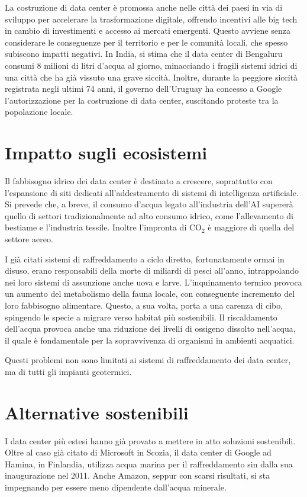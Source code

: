 \documentclass[12pt,a4paper,oneside]{book}
\begin{document}
La costruzione di data center è promossa anche nelle città dei paesi in via di sviluppo per accelerare la trasformazione digitale, offrendo incentivi alle big tech in cambio di investimenti e accesso ai mercati emergenti. Questo avviene senza considerare le conseguenze per il territorio e per le comunità locali, che spesso subiscono impatti negativi.
In India, si stima che il data center di Bengaluru consumi 8 milioni di litri d'acqua al giorno, minacciando i fragili sistemi idrici di una città che ha già vissuto una grave siccità.
Inoltre, durante la peggiore siccità registrata negli ultimi 74 anni, il governo dell'Uruguay ha concesso a Google l'autorizzazione per la costruzione di data center, suscitando proteste tra la popolazione locale.

\section{Impatto sugli ecosistemi}
Il fabbisogno idrico dei data center è destinato a crescere, soprattutto con l'espansione di siti dedicati all'addestramento di sistemi di intelligenza artificiale. Si prevede che, a breve, il consumo d'acqua legato all'industria dell'AI supererà quello di settori tradizionalmente ad alto consumo idrico, come l'allevamento di bestiame e l'industria tessile. Inoltre l'impronta di CO$_2$ è maggiore di quella del settore aereo.

I già citati sistemi di raffreddamento a ciclo diretto, fortunatamente ormai in disuso, erano responsabili della morte di miliardi di pesci all'anno, intrappolando nei loro sistemi di assunzione anche uova e larve. L'inquinamento termico provoca un aumento del metabolismo della fauna locale, con conseguente incremento del loro fabbisogno alimentare. Questo, a sua volta, porta a una carenza di cibo, spingendo le specie a migrare verso habitat più sostenibili. Il riscaldamento dell'acqua provoca anche una riduzione dei livelli di ossigeno dissolto nell'acqua, il quale è fondamentale per la sopravvivenza di organismi in ambienti acquatici.

Questi problemi non sono limitati ai sistemi di raffreddamento dei data center, ma di tutti gli impianti geotermici.

\section{Alternative sostenibili}

I data center più estesi hanno già provato a mettere in atto soluzioni sostenibili. Oltre al caso già citato di Microsoft in Scozia, il data center di Google ad Hamina, in Finlandia, utilizza acqua marina per il raffreddamento sin dalla sua inaugurazione nel 2011. Anche Amazon, seppur con scarsi risultati, si sta impegnando per essere meno dipendente dall'acqua minerale.
\end{document}
